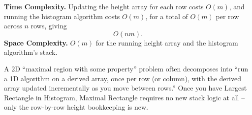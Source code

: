 \begin{complexitybox}
\textbf{Time Complexity.} Updating the height array for each row costs
$O(m)$, and running the histogram algorithm costs $O(m)$, for a total of
$O(m)$ per row across $n$ rows, giving
\[
  O(nm).
\]
\textbf{Space Complexity.} $O(m)$ for the running height array and the
histogram algorithm's stack.
\end{complexitybox}

\begin{takeawaybox}
A 2D ``maximal region with some property'' problem often decomposes into
``run a 1D algorithm on a derived array, once per row (or column), with
the derived array updated incrementally as you move between rows.'' Once
you have Largest Rectangle in Histogram, Maximal Rectangle requires no new
stack logic at all -- only the row-by-row height bookkeeping is new.
\end{takeawaybox}
